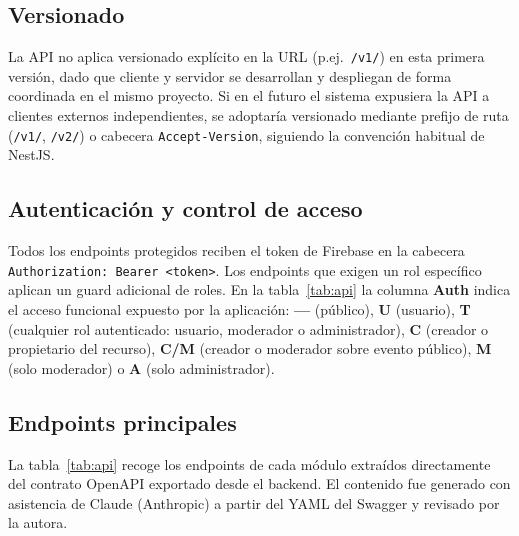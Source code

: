 \subsection{Versionado}

La API no aplica versionado explícito en la URL (p.ej.\ \texttt{/v1/}) en esta primera versión, dado que cliente y servidor se desarrollan y despliegan de forma coordinada en el mismo proyecto. Si en el futuro el sistema expusiera la API a clientes externos independientes, se adoptaría versionado mediante prefijo de ruta (\texttt{/v1/}, \texttt{/v2/}) o cabecera \texttt{Accept-Version}, siguiendo la convención habitual de NestJS.

\subsection{Autenticación y control de acceso}

Todos los endpoints protegidos reciben el token de Firebase en la cabecera \texttt{Authorization: Bearer <token>}. Los endpoints que exigen un rol específico aplican un guard adicional de roles. En la tabla~\ref{tab:api} la columna \textbf{Auth} indica el acceso funcional expuesto por la aplicación: \textbf{—} (público), \textbf{U} (usuario), \textbf{T} (cualquier rol autenticado: usuario, moderador o administrador), \textbf{C} (creador o propietario del recurso), \textbf{C/M} (creador o moderador sobre evento público), \textbf{M} (solo moderador) o \textbf{A} (solo administrador).

\subsection{Endpoints principales}

La tabla~\ref{tab:api} recoge los endpoints de cada módulo extraídos directamente del contrato OpenAPI exportado desde el backend. El contenido fue generado con asistencia de Claude (Anthropic) a partir del YAML del Swagger y revisado por la autora.

